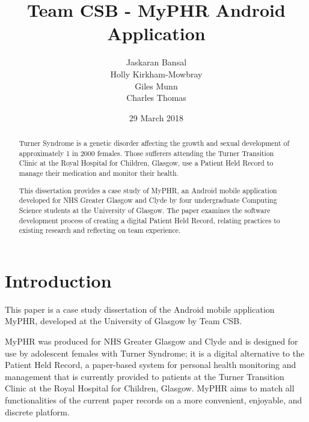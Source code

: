 \documentclass{l3proj}
\begin{document}
\title{Team CSB - MyPHR Android Application}

\author{Jaskaran Bansal\\
        Holly Kirkham-Mowbray\\
        Giles Munn\\
        Charles Thomas}

\date{29 March 2018}

\maketitle
 
\begin{abstract}
Turner Syndrome is a genetic disorder affecting the growth and sexual development of approximately 1 in 2000 females. Those sufferers attending the Turner Transition Clinic at the Royal Hospital for Children, Glasgow, use a Patient Held Record to manage their medication and monitor their health.

This dissertation provides a case study of MyPHR, an Android mobile application developed for NHS Greater Glasgow and Clyde by four undergraduate Computing Science students at the University of Glasgow. The paper examines the software development process of creating a digital Patient Held Record, relating practices to existing research and reflecting on team experience.

\end{abstract}

\educationalconsent
\newpage


\section{Introduction}
This paper is a case study dissertation of the Android mobile application MyPHR, developed at the University of Glasgow by Team CSB.

MyPHR was produced for NHS Greater Glasgow and Clyde and is designed for use by adolescent females with Turner Syndrome; it is a digital alternative to the Patient Held Record, a paper-based system for personal health monitoring and management that is currently provided to patients at the Turner Transition Clinic at the Royal Hospital for Children, Glasgow. MyPHR aims to match all functionalities of the current paper records on a more convenient, enjoyable, and discrete platform.
\end{document}
